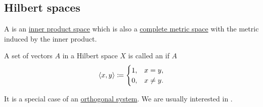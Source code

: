 \subsection{Hilbert spaces}\label{subsec:hilbert_spaces}

\begin{Definition}\label{def:hilbert_space}
  A  is an \hyperref[def:inner_product_space]{inner product space} which is also a \hyperref[def:complete_metric_space]{complete metric space} with the metric induced by the inner product.
\end{Definition}

\begin{Definition}\label{def:orthonormal_system}
  A set of vectors \( A \) in a Hilbert space \( X \) is called an  if \( A \)
  \begin{equation*}
    \left\langle x, y \right\rangle \coloneqq \begin{cases}
      1, &x = y, \\
      0, &x \neq y.
    \end{cases}
  \end{equation*}

  It is a special case of an \hyperref[def:orthogonality]{orthogonal system}. We are usually interested in .
\end{Definition}

